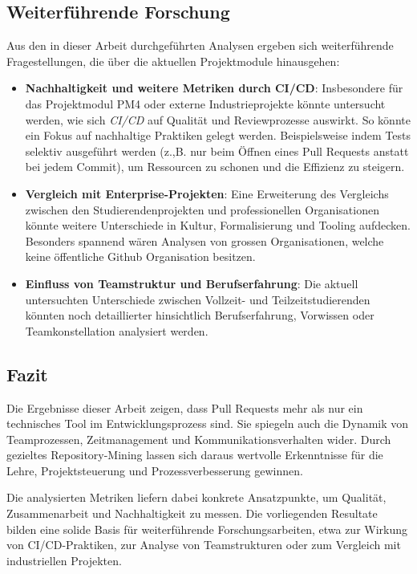 \subsection{Weiterführende Forschung}
Aus den in dieser Arbeit durchgeführten Analysen ergeben sich weiterführende Fragestellungen, die über die aktuellen Projektmodule hinausgehen:
\begin{itemize}
\item \textbf{Nachhaltigkeit und weitere Metriken durch CI/CD}: Insbesondere für das Projektmodul PM4 oder externe Industrieprojekte könnte untersucht werden, wie sich \textit{CI/CD} auf Qualität und Reviewprozesse auswirkt. So könnte ein Fokus auf nachhaltige Praktiken gelegt werden. Beispielsweise indem Tests selektiv ausgeführt werden (z.,B. nur beim Öffnen eines Pull Requests anstatt bei jedem Commit), um Ressourcen zu schonen und die Effizienz zu steigern.
\item \textbf{Vergleich mit Enterprise-Projekten}: Eine Erweiterung des Vergleichs zwischen den Studierendenprojekten und professionellen Organisationen könnte weitere Unterschiede in Kultur, Formalisierung und Tooling aufdecken. Besonders spannend wären Analysen von grossen Organisationen, welche keine öffentliche Github Organisation besitzen.
\item \textbf{Einfluss von Teamstruktur und Berufserfahrung}: Die aktuell untersuchten Unterschiede zwischen Vollzeit- und Teilzeitstudierenden könnten noch detaillierter hinsichtlich Berufserfahrung, Vorwissen oder Teamkonstellation analysiert werden.
\end{itemize}


\subsection{Fazit}

Die Ergebnisse dieser Arbeit zeigen, dass Pull Requests mehr als nur ein technisches Tool im Entwicklungsprozess sind. Sie spiegeln auch die Dynamik von Teamprozessen, Zeitmanagement und Kommunikationsverhalten wider. Durch gezieltes Repository-Mining lassen sich daraus wertvolle Erkenntnisse für die Lehre, Projektsteuerung und Prozessverbesserung gewinnen.

Die analysierten Metriken liefern dabei konkrete Ansatzpunkte, um Qualität, Zusammenarbeit und Nachhaltigkeit zu messen.
Die vorliegenden Resultate bilden eine solide Basis für weiterführende Forschungsarbeiten, etwa zur Wirkung von CI/CD-Praktiken, zur Analyse von Teamstrukturen oder zum Vergleich mit industriellen Projekten.